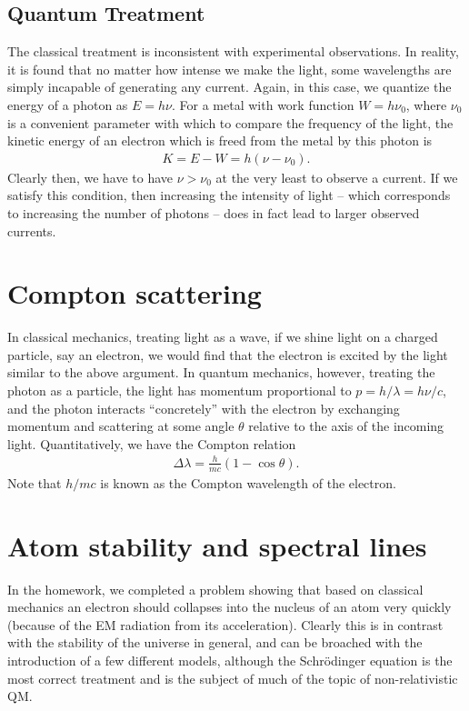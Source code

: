 \subsection{Quantum Treatment}

The classical treatment is inconsistent with experimental observations.
In reality, it is found that no matter how intense we make the light, some wavelengths are simply incapable of generating any current.
Again, in this case, we quantize the energy of a photon as $E = h \nu$.
For a metal with work function $W = h \nu_0$, where $\nu_0$ is a convenient parameter with which to compare the frequency of the light, the kinetic energy of an electron which is freed from the metal by this photon is
\begin{eqnarray}
    K = E - W = h (\nu - \nu_0)
.\end{eqnarray}
Clearly then, we have to have $\nu > \nu_0$ at the very least to observe a current.
If we satisfy this condition, then increasing the intensity of light -- which corresponds to increasing the number of photons -- does in fact lead to larger observed currents.


\section{Compton scattering}

In classical mechanics, treating light as a wave, if we shine light on a charged particle, say an electron, we would find that the electron is excited by the light similar to the above argument.
In quantum mechanics, however, treating the photon as a particle, the light has momentum proportional to $p = h/\lambda = h \nu / c$, and the photon interacts ``concretely'' with the electron by exchanging momentum and scattering at some angle $\theta$ relative to the axis of the incoming light.
Quantitatively, we have the Compton relation
\begin{eqnarray}
    \Delta \lambda = \frac{h}{m c} (1 - \cos{\theta})
.\end{eqnarray}
Note that $h/mc$ is known as the Compton wavelength of the electron.


\section{Atom stability and spectral lines}

In the homework, we completed a problem showing that based on classical mechanics an electron should collapses into the nucleus of an atom very quickly (because of the EM radiation from its acceleration).
Clearly this is in contrast with the stability of the universe in general, and can be broached with the introduction of a few different models, although the Schr\"{o}dinger equation is the most correct treatment and is the subject of much of the topic of non-relativistic QM.

